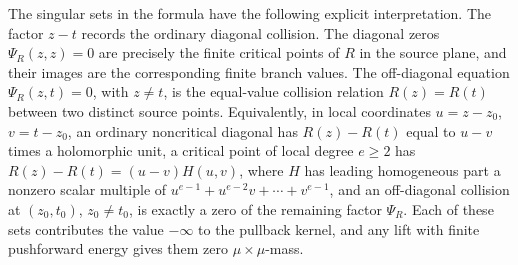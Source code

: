 \begin{proposition}
The singular sets in the formula have the following explicit interpretation.  The factor \(z-t\) records the ordinary diagonal collision.  The diagonal zeros \(\Psi_R(z,z)=0\) are precisely the finite critical points of \(R\) in the source plane, and their images are the corresponding finite branch values.  The off-diagonal equation \(\Psi_R(z,t)=0\), with \(z\ne t\), is the equal-value collision relation \(R(z)=R(t)\) between two distinct source points.  Equivalently, in local coordinates \(u=z-z_0\), \(v=t-z_0\), an ordinary noncritical diagonal has \(R(z)-R(t)\) equal to \(u-v\) times a holomorphic unit, a critical point of local degree \(e\ge2\) has \(R(z)-R(t)=(u-v)H(u,v)\), where \(H\) has leading homogeneous part a nonzero scalar multiple of \(u^{e-1}+u^{e-2}v+\cdots+v^{e-1}\), and an off-diagonal collision at \((z_0,t_0)\), \(z_0\ne t_0\), is exactly a zero of the remaining factor \(\Psi_R\).  Each of these sets contributes the value \(-\infty\) to the pullback kernel, and any lift with finite pushforward energy gives them zero \(\mu\times\mu\)-mass.
\end{proposition}

